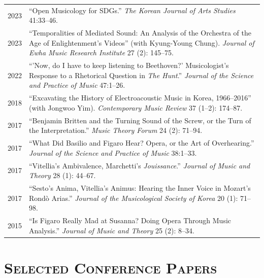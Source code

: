 \documentclass[a4paper,11pt,draft]{article}
\begin{document}
\begin{tabular}{p{2.5cm} p{12.5cm}}
    2023 & ``Open Musicology for SDGs.'' \textit{The Korean Journal of Arts Studies} 41:33--46.\\[2mm]
    
    2023 & ``Temporalities of Mediated Sound: An Analysis of the Orchestra of the Age of Enlightenment's Videos'' (with Kyung-Young Chung). \textit{Journal of Ewha Music Research Institute} 27 (2): 145--75.\\[2mm]
    
    2022 & ``'Now, do I have to keep listening to Beethoven?' Musicologist's Response to a Rhetorical Question in \textit{The Hunt}.'' \textit{Journal of the Science and Practice of Music} 47:1--26.\\[2mm]
    
    2018 & ``Excavating the History of Electroacoustic Music in Korea, 1966--2016'' (with Jongwoo Yim). \textit{Contemporary Music Review} 37 (1--2): 174--87.\\[2mm]
    
    2017 & ``Benjamin Britten and the Turning Sound of the Screw, or the Turn of the Interpretation.'' \textit{Music Theory Forum} 24 (2): 71--94.\\[2mm]
    
    2017 & ``What Did Basilio and Figaro Hear? Opera, or the Art of Overhearing.'' \textit{Journal of the Science and Practice of Music} 38:1--33.\\[2mm]
    
    2017 & ``Vitellia's Ambivalence, Marchetti's \textit{Jouissance}.'' \textit{Journal of Music and Theory} 28 (1): 44--67.\\[2mm]
    
    2017 & ``Sesto's Anima, Vitellia's Animus: Hearing the Inner Voice in Mozart's Rond\`{o} Arias.'' \textit{Journal of the Musicological Society of Korea} 20 (1): 71--98.\\[2mm]
    
    2015 & ``Is Figaro Really Mad at Susanna? Doing Opera Through Music Analysis.'' \textit{Journal of Music and Theory} 25 (2): 8--34.
  \end{tabular}
  
  \vspace*{5mm}
  
  \section*{\textsc{Selected Conference Papers}}
  
\end{document}
